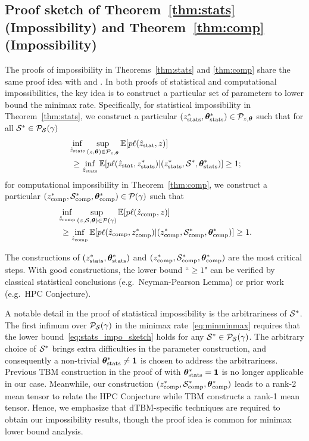 \documentclass[journal]{IEEEtran}
\theoremstyle{definition}
\theoremstyle{definition}
\begin{document}
\subsection{Proof sketch of Theorem~\ref{thm:stats} (Impossibility) and Theorem~\ref{thm:comp} (Impossibility)} \label{subsec:impossible}

The proofs of impossibility in Theorems~\ref{thm:stats} and \ref{thm:comp} share the same proof idea with \cite[Theorems 6 and 7]{han2020exact} and \cite[Theorem 2]{gao2018community}. In both proofs of statistical and computational impossibilities, the key idea is to construct a particular set of parameters to lower bound the minimax rate. Specifically, for statistical impossibility in Theorem~\ref{thm:stats}, we construct a particular $(z^*_{\rm stats}, \boldsymbol{\theta}^*_{\rm stats})  \in \mathcal{P}_{z, \boldsymbol{\theta}} $ such that for all $\mathcal{S}^* \in \mathcal{P}_{\mathcal{S}}(\gamma)$
\begin{align}
    & \inf_{\hat z_{\rm stats}} \sup_{(z, \mtheta) \in \tP_{z, \mtheta}} \bbE[p \ell(\hat z_{\rm stat}, z)] \\
     & \ \geq \inf_{\hat z_{\rm stats}} \bbE[p \ell(\hat z_{\rm stat}, z_{\rm stats}^*)| (z^*_{\rm stats}, \tS^*,\mtheta^*_{\rm stats})] \geq 1;\label{eq:stats_impo_sketch}  
\end{align}
for computational impossibility in Theorem~\ref{thm:comp}, we construct a particular $(z^*_{\rm comp}, \mathcal{S}^*_{\rm comp}, \boldsymbol{\theta}^*_{\rm comp}) \in \mathcal{P}(\gamma)$ such that
\begin{align}
    &\inf_{\hat z_{\rm comp}} \sup_{(z, \mathcal{S}, \boldsymbol{\theta}) \in \mathcal{P}(\gamma)} \mathbb{E}[p \ell(\hat z_{\rm comp}, z)] \\
    &\ \geq \inf_{\hat z_{\rm comp}} \mathbb{E}[p \ell(\hat z_{\rm comp}, z_{\rm comp}^*)| (z^*_{\rm comp}, \mathcal{S}^*_{\rm comp},\boldsymbol{\theta}^*_{\rm comp})] \geq 1.
\end{align}


The constructions of $(z^*_{\rm stats}, \boldsymbol{\theta}^*_{\rm stats})$ and $(z^*_{\rm comp}, \mathcal{S}^*_{\rm comp}, \boldsymbol{\theta}^*_{\rm comp})$ are the most critical steps. With good constructions, the lower bound ``$\geq 1$" can be verified by classical statistical conclusions (e.g.\ Neyman-Pearson Lemma) or prior work (e.g.\ HPC Conjecture). 

A notable detail in the proof of statistical impossibility is the arbitrariness of $\mathcal{S}^*$. The first infimum over $ \mathcal{P}_{\mathcal{S}}(\gamma)$ in the minimax rate~\eqref{eq:minminmax} requires that the lower bound~\eqref{eq:stats_impo_sketch} holds for any $\mathcal{S}^* \in \mathcal{P}_{\mathcal{S}}(\gamma)$. The arbitrary choice of $\mathcal{S}^*$ brings extra difficulties in the parameter construction, and consequently a non-trivial $\boldsymbol{\theta}^*_{\rm stats} \neq \mathbf{1}$ is chosen to address the arbitrariness. Previous TBM construction in the proof of \cite[Theorem 6]{han2020exact} with $\boldsymbol{\theta}^*_{\rm stats} = \mathbf{1}$ is no longer applicable in our case. Meanwhile, our construction $(z^*_{\rm comp}, \mathcal{S}^*_{\rm comp}, \boldsymbol{\theta}^*_{\rm comp})$ leads to a rank-2 mean tensor to relate the HPC Conjecture while TBM \cite[Theorem 7]{han2020exact} constructs a rank-1 mean tensor. Hence, we emphasize that dTBM-specific techniques are required to obtain our impossibility results, though the proof idea is common for minimax lower bound analysis. 
\end{document}
